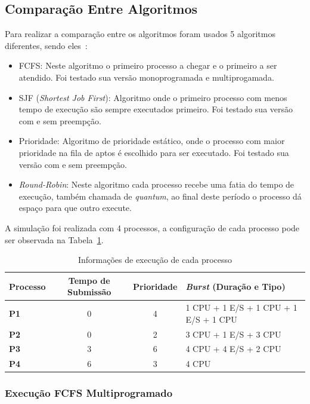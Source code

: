 \documentclass[
	12pt,				%
	oneside,   	        %
	a4paper,			%
	english,			%
	french,				%
	spanish,			%
	brazil,				%
	]{pacotes/abntex2}
\begin{document}
\subsection{Comparação Entre Algoritmos}
\label{subsec:algoritmos}

Para realizar a comparação entre os algoritmos foram usados 5 algoritmos diferentes, sendo eles~\cite{maziero2019}:

\begin{itemize}
  \item FCFS: Neste algoritmo o primeiro processo a chegar e o primeiro a ser atendido. Foi testado sua versão monoprogramada e multiprogamada.
  \item SJF (\textit{Shortest Job First}): Algoritmo onde o primeiro processo com menos tempo de execução são sempre executados primeiro. Foi testado sua versão com e sem preempção.
  \item Prioridade: Algoritmo de prioridade estático, onde o processo com maior prioridade na fila de aptos é escolhido para ser executado. Foi testado sua versão com e sem preempção.
  \item \textit{Round-Robin}: Neste algoritmo cada processo recebe uma fatia do tempo de execução, também chamada de \textit{quantum}, ao final deste período o processo dá espaço para que outro execute.
\end{itemize}

A simulação foi realizada com 4 processos, a configuração de cada processo pode ser observada na Tabela~\ref{tab:processos}.

\begin{table}[H]
\centering
\caption{Informações de execução de cada processo}
\label{tab:processos}
\footnotesize
\begin{tabular}{l|c|c|l}
\toprule
\textbf{Processo} & \textbf{Tempo de Submissão} & \textbf{Prioridade} & \textbf{\textit{Burst} (Duração e Tipo)} \\ 
\midrule
\textbf{P1} & 0  & 4 & 1 CPU + 1 E/S + 1 CPU + 1 E/S + 1 CPU \\
\textbf{P2} & 0  & 2 & 3 CPU + 1 E/S + 3 CPU \\
\textbf{P3} & 3  & 6 & 4 CPU + 4 E/S + 2 CPU \\
\textbf{P4} & 6  & 3 & 4 CPU \\
\bottomrule
\end{tabular}
\end{table}

\subsubsection{Execução FCFS Multiprogramado}
\label{subsubsec:fcfs_multi}
\end{document}
